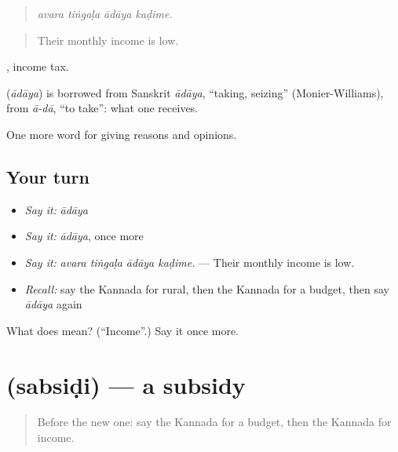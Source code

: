 \begin{quote}
\emph{avara tiṅgaḷa ādāya kaḍime.}
\end{quote}

\begin{quote}
Their monthly income is low.
\end{quote}

 , income tax.

\begin{cousinweb}
\textbf{} (\emph{ādāya}) is borrowed from Sanskrit \emph{ādāya}, \textquotedblleft{}taking, seizing\textquotedblright{} (Monier-Williams), from \emph{ā-dā}, \textquotedblleft{}to take\textquotedblright{}: what one receives.
\end{cousinweb}

\begin{grammarlens}[title={What you've built}]
One more word for giving reasons and opinions.
\end{grammarlens}

\subsection*{Your turn}
\begin{itemize}
\raggedright
  \item \emph{Say it:} \emph{ādāya}
  \item \emph{Say it:} \emph{ādāya}, once more
  \item \emph{Say it:} \emph{avara tiṅgaḷa ādāya kaḍime.} — Their monthly income is low.
  \item \emph{Recall:} say the Kannada for rural, then the Kannada for a budget, then say \emph{ādāya} again
\end{itemize}

\begin{tcolorbox}[breakable,colback=teal!4,colframe=teal!35!black,title={Before you move on}]
What does  mean? (\textquotedblleft{}Income\textquotedblright{}.) Say it once more.
\end{tcolorbox}
\section[\texorpdfstring{\kn{ಸಬ್ಸಿಡಿ} (sabsiḍi)}{ಸಬ್ಸಿಡಿ (sabsiḍi)}]{ (sabsiḍi) — a subsidy}

\label{lesson:KA-C400-sabsidi}



\begin{quote}
Before the new one: say the Kannada for a budget, then the Kannada for income.
\end{quote}

